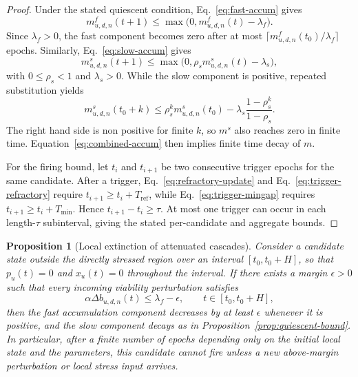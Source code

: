 \documentclass[5p,times]{elsarticle}
\newtheorem{proposition}{Proposition}
\begin{document}
\begin{proof}
Under the stated quiescent condition, Eq.~\eqref{eq:fast-accum} gives
\begin{equation}
m^{f}_{u,d,n}(t+1)
\le \max\big(0,m^{f}_{u,d,n}(t)-\lambda_f\big).
\end{equation}
Since $\lambda_f>0$, the fast component becomes zero after at most
$\lceil m^{f}_{u,d,n}(t_0)/\lambda_f\rceil$ epochs. Similarly, Eq.~\eqref{eq:slow-accum} gives
\begin{equation}
m^{s}_{u,d,n}(t+1)
\le \max\big(0,\rho_s m^{s}_{u,d,n}(t)-\lambda_s\big),
\end{equation}
with $0\le \rho_s<1$ and $\lambda_s>0$. While the slow component is positive, repeated substitution yields
\begin{equation}
m^{s}_{u,d,n}(t_0+k)
\le
\rho_s^k m^{s}_{u,d,n}(t_0)
-\lambda_s\frac{1-\rho_s^k}{1-\rho_s}.
\end{equation}
The right hand side is non positive for finite $k$, so $m^s$ also reaches zero in finite time. Equation~\eqref{eq:combined-accum} then implies finite time decay of $m$.

For the firing bound, let $t_i$ and $t_{i+1}$ be two consecutive trigger epochs for the same candidate. After a trigger, Eq.~\eqref{eq:refractory-update} and Eq.~\eqref{eq:trigger-refractory} require $t_{i+1}\ge t_i+T_{\mathrm{ref}}$, while Eq.~\eqref{eq:trigger-mingap} requires $t_{i+1}\ge t_i+T_{\min}$. Hence $t_{i+1}-t_i\ge \tau$. At most one trigger can occur in each length-$\tau$ subinterval, giving the stated per-candidate and aggregate bounds.
\end{proof}

\begin{proposition}[Local extinction of attenuated cascades]
\label{prop:cascade-extinction}
Consider a candidate state outside the directly stressed region over an interval $[t_0,t_0+H]$, so that $p_u(t)=0$ and $x_u(t)=0$ throughout the interval. If there exists a margin $\epsilon>0$ such that every incoming viability perturbation satisfies
\begin{equation}
\alpha \Delta b_{u,d,n}(t)\le \lambda_f-\epsilon,
\qquad t\in[t_0,t_0+H],
\end{equation}
then the fast accumulation component decreases by at least $\epsilon$ whenever it is positive, and the slow component decays as in Proposition~\ref{prop:quiescent-bound}. In particular, after a finite number of epochs depending only on the initial local state and the parameters, this candidate cannot fire unless a new above-margin perturbation or local stress input arrives.
\end{proposition}
\end{document}
